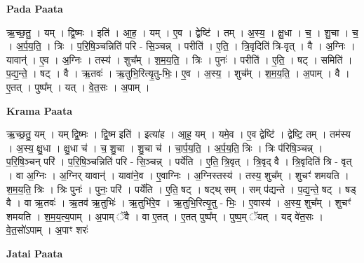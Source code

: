 \documentclass[17pt]{extarticle}
\begin{document}
\textbf{Pada Paata} \newline

ऋ॒च्छ॒तु॒ । यम् । द्वि॒ष्मः । इति॑ । आ॒ह॒ । यम् । ए॒व । द्वेष्टि॑ । तम् । अ॒स्य॒ । क्षु॒धा । च॒ । शु॒चा । च॒ । अ॒र्प॒य॒ति॒ । त्रिः । प॒रि॒षि॒ञ्चन्निति॑ परि - सि॒ञ्चन्न् । परीति॑ । ए॒ति॒ । त्रि॒वृदिति॑ त्रि-वृत् । वै । अ॒ग्निः । यावान्॑ । ए॒व । अ॒ग्निः । तस्य॑ । शुच᳚म् । श॒म॒य॒ति॒ । त्रिः । पुनः॑ । परीति॑ । ए॒ति॒ । षट् । समिति॑ । प॒द्य॒न्ते॒ । षट् । वै । ऋ॒तवः॑ । ऋ॒तुभि॒रित्यृ॒तु-भिः॒। ए॒व । अ॒स्य॒ । शुच᳚म् । श॒म॒य॒ति॒ । अ॒पाम् । वै । ए॒तत् । पुष्प᳚म् । यत् । वे॒त॒सः । अ॒पाम् ।  \newline


\textbf{Krama Paata} \newline

ऋ॒च्छ॒तु॒ यम् । यम् द्वि॒ष्मः । द्वि॒ष्म इति॑ । इत्या॑ह । आ॒ह॒ यम् । यमे॒व । ए॒व द्वेष्टि॑ । द्वेष्टि॒ तम् । तम॑स्य । अ॒स्य॒ क्षु॒धा । क्षु॒धा च॑ । च॒ शु॒चा । शु॒चा च॑ । चा॒र्प॒य॒ति॒ । अ॒र्प॒य॒ति॒ त्रिः । त्रिः प॑रिषि॒ञ्चन्न् । प॒रि॒षि॒ञ्चन् परि॑ । प॒रि॒षि॒ञ्चन्निति॑ परि - सि॒ञ्चन्न् । पर्ये॑ति । ए॒ति॒ त्रि॒वृत् । त्रि॒वृद् वै । त्रि॒वृदिति॑ त्रि - वृत् । वा अ॒ग्निः । अ॒ग्निर् यावान्॑ । यावा॑ने॒व । ए॒वाग्निः । अ॒ग्निस्तस्य॑ । तस्य॒ शुच᳚म् । शुचꣳ॑ शमयति । श॒म॒य॒ति॒ त्रिः । त्रिः पुनः॑ । पुनः॒ परि॑ । पर्ये॑ति । ए॒ति॒ षट् । षट्थ् सम् । सम् प॑द्यन्ते । प॒द्य॒न्ते॒ षट् । षड् वै । वा ऋ॒तवः॑ । ऋ॒तव॑ ऋ॒तुभिः॑ । ऋ॒तुभि॑रे॒व । ऋ॒तुभि॒रित्यृ॒तु - भिः॒ । ए॒वास्य॑ । अ॒स्य॒ शुच᳚म् । शुचꣳ॑ शमयति । श॒म॒य॒त्य॒पाम् । अ॒पाम् ॅवै । वा ए॒तत् । ए॒तत् पुष्प᳚म् । पुष्प॒म् ॅयत् । यद् वे॑त॒सः । वे॒त॒सो॑ऽपाम् । अ॒पाꣳ शरः॑ \newline

\textbf{Jatai Paata} \newline
\end{document}
